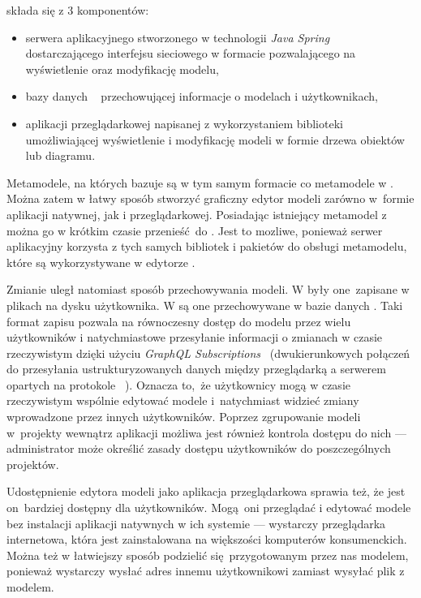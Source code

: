 \SiriusWeb{} składa się z 3 komponentów:

\begin{itemize}
	\item serwera aplikacyjnego stworzonego w technologii \emph{Java
		      Spring}~\cite{java-spring-homepage} dostarczającego interfejsu sieciowego  w formacie \GraphQL{} pozwalającego na wyświetlenie oraz modyfikację modelu,
	\item bazy danych \PostgreSQL{}~\cite{postgresql-homepage} przechowującej informacje o modelach i użytkownikach,
	\item aplikacji przeglądarkowej napisanej z wykorzystaniem biblioteki \React{}~\cite{react-homepage} umożliwiającej wyświetlenie i modyfikację modeli w formie drzewa obiektów lub diagramu.
\end{itemize}

Metamodele, na których bazuje \SiriusWeb{} są w tym samym formacie \EMF{} co
metamodele w \SiriusDesktop{}. Można zatem w łatwy sposób stworzyć
graficzny edytor modeli zarówno w~formie aplikacji natywnej, jak i
przeglądarkowej. Posiadając istniejący metamodel 
z~\SiriusDesktop{} można go w krótkim czasie przenieść do \SiriusWeb{}. Jest
to
mozliwe, ponieważ serwer aplikacyjny korzysta z tych samych bibliotek i
pakietów do obsługi metamodelu, które są wykorzystywane w edytorze
\SiriusDesktop{}.

Zmianie uległ natomiast sposób przechowywania modeli. W \SiriusDesktop{}
były one~zapisane w plikach na dysku użytkownika. W \SiriusWeb{} są one
przechowywane w bazie danych \PostgreSQL{}. Taki format zapisu pozwala na
równoczesny dostęp do modelu przez wielu użytkowników i natychmiastowe
przesyłanie informacji o zmianach w czasie rzeczywistym dzięki użyciu
\emph{GraphQL Subscriptions}~\cite{graphql-subscriptions} (dwukierunkowych
połączeń do przesyłania ustrukturyzowanych danych między przeglądarką a
serwerem opartych na protokole \WebSocket{}~\cite{wikipedia-websocket}).
Oznacza to, że użytkownicy mogą w czasie rzeczywistym wspólnie edytować modele
i~natychmiast widzieć zmiany wprowadzone przez innych użytkowników.
Poprzez zgrupowanie modeli w~projekty wewnątrz aplikacji \SiriusWeb{}
możliwa jest również kontrola dostępu do nich --- administrator może określić
zasady dostępu użytkowników do poszczególnych projektów.

Udostępnienie edytora modeli jako aplikacja przeglądarkowa sprawia też, że jest
on~bardziej dostępny dla użytkowników. Mogą oni przeglądać i edytować modele
bez instalacji aplikacji natywnych w ich systemie --- wystarczy przeglądarka
internetowa, która jest zainstalowana na większości komputerów konsumenckich.
Można też w łatwiejszy sposób podzielić się~przygotowanym przez nas modelem,
ponieważ wystarczy wysłać adres  innemu użytkownikowi zamiast
wysyłać plik z modelem.

